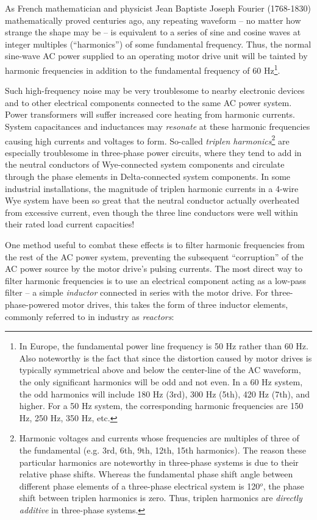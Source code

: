 As French mathematician and physicist Jean Baptiste Joseph Fourier (1768-1830) mathematically proved centuries ago, any repeating waveform -- no matter how strange the shape may be -- is equivalent to a series of sine and cosine waves at integer multiples (``harmonics'') of some fundamental frequency.  Thus, the normal sine-wave AC power supplied to an operating motor drive unit will be tainted by harmonic frequencies in addition to the fundamental frequency of 60 Hz\footnote{In Europe, the fundamental power line frequency is 50 Hz rather than 60 Hz.  Also noteworthy is the fact that since the distortion caused by motor drives is typically symmetrical above and below the center-line of the AC waveform, the only significant harmonics will be odd and not even.  In a 60 Hz system, the odd harmonics will include 180 Hz (3rd), 300 Hz (5th), 420 Hz (7th), and higher.  For a 50 Hz system, the corresponding harmonic frequencies are 150 Hz, 250 Hz, 350 Hz, etc.}.     

Such high-frequency noise may be very troublesome to nearby electronic devices and to other electrical components connected to the same AC power system.  Power transformers will suffer increased core heating from harmonic currents.  System capacitances and inductances may \textit{resonate} at these harmonic frequencies causing high currents and voltages to form.  So-called \textit{triplen harmonics}\footnote{Harmonic voltages and currents whose frequencies are multiples of three of the fundamental (e.g. 3rd, 6th, 9th, 12th, 15th harmonics).  The reason these particular harmonics are noteworthy in three-phase systems is due to their relative phase shifts.  Whereas the fundamental phase shift angle between different phase elements of a three-phase electrical system is 120$^{o}$, the phase shift between triplen harmonics is zero.  Thus, triplen harmonics are \textit{directly additive} in three-phase systems.} are especially troublesome in three-phase power circuits, where they tend to add in the neutral conductors of Wye-connected system components and circulate through the phase elements in Delta-connected system components.  In some industrial installations, the magnitude of triplen harmonic currents in a 4-wire Wye system have been so great that the neutral conductor actually overheated from excessive current, even though the three line conductors were well within their rated load current capacities!

\filbreak

One method useful to combat these effects is to filter harmonic frequencies from the rest of the AC power system, preventing the subsequent ``corruption'' of the AC power source by the motor drive's pulsing currents.  The most direct way to filter harmonic frequencies is to use an electrical component acting as a low-pass filter -- a simple \textit{inductor} connected in series with the motor drive.  For three-phase-powered motor drives, this takes the form of three inductor elements, commonly referred to in industry as \textit{reactors}:    

